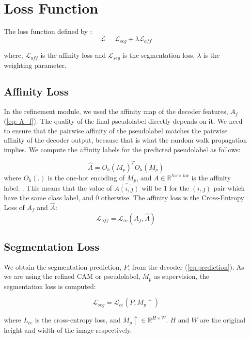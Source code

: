\section{Loss Function}
\label{subsec:loss_func}

The loss function defined by \cite{wsss_frozen_clip}:
\begin{equation}
    \mathcal{L} = \mathcal{L}_{seg} + \lambda \mathcal{L}_{aff}
\end{equation}

where, $\mathcal{L}_{aff}$ is the affinity loss and $\mathcal{L}_{seg}$ is the segmentation loss. $\lambda$ is the weighting parameter.
\subsection{Affinity Loss}
\label{aff_loss}

In the refinement module, we used the affinity map of the decoder features, $A_f$ (\autoref{eq: A_f}). The quality of the final pseudolabel directly depends on it. We need to ensure that the pairwise affinity of the pseudolabel matches the pairwise affinity of the decoder output, because that is what the random walk propagation implies.
We compute the affinity labels for the predicted pseudolabel as follows:

\begin{equation}
    \hat{A} = O_h(M_p)^TO_h(M_p)
\end{equation}
where $O_h(.)$ is the one-hot encoding of $M_p$, and $A \in \mathbb{R}^{hw \times hw}$  is the affinity label.
. This means that the value of $\hat{A(i,j)}$ will be 1 for the $(i,j)$ pair which have the same class label, and 0 otherwise. The affinity loss is the Cross-Entropy Loss of $A_f$ and $\hat{A}$:
\begin{equation}
    \mathcal{L}_{aff} = \mathcal{L}_{ce}(A_f, \hat{A})
\end{equation}

\subsection{Segmentation Loss}
\label{seg_loss}
We obtain the segmentation prediction, $P$, from the decoder (\autoref{eq:prediction}). As we are using the refined CAM or pseudolabel, $M_p$ as supervision, the segmentation loss is computed:

\begin{equation}
    \mathcal{L}_{seg} = \mathcal{L}_{ce}(P, M_p \uparrow)
\end{equation}

where \( L_{ce} \) is the cross-entropy loss, and \( M_p{\uparrow} \in \mathbb{R}^{H \times W} \). $H$ and $W$ are the original height and width of the image respectively.


